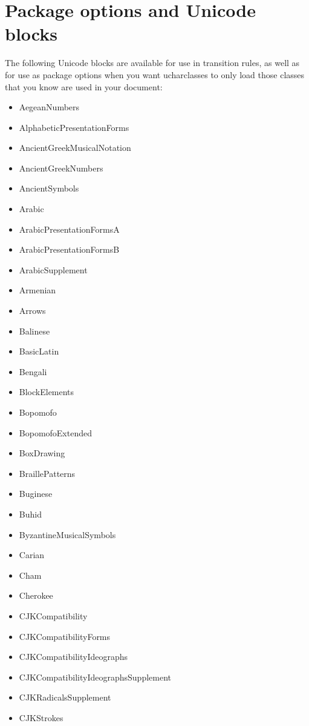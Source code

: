 ﻿\documentclass{article}
\newenvironment{itemlist}{%
  \begin{itemize}
	\setlength{\itemsep}{0pt}
	\setlength{\parsep}{0pt}
	\setlength{\topsep}{0pt}
	\setlength{\partopsep}{0pt}
	\setlength{\parskip}{0pt}
	\setlength{\labelsep}{5pt}}%
{
  \end{itemize}}
\begin{document}
	\section{Package options and Unicode blocks}
	
		The following Unicode blocks are available for use in transition rules, as well as for use as package options when you want ucharclasses to only load those classes that you know are used in your document:
		
		\begin{multicols}{2}
			\begin{itemlist}
				\item AegeanNumbers
				\item AlphabeticPresentationForms
				\item AncientGreekMusicalNotation
				\item AncientGreekNumbers
				\item AncientSymbols
				\item Arabic
				\item ArabicPresentationFormsA
				\item ArabicPresentationFormsB
				\item ArabicSupplement
				\item Armenian
				\item Arrows
				\item Balinese
				\item BasicLatin
				\item Bengali
				\item BlockElements
				\item Bopomofo
				\item BopomofoExtended
				\item BoxDrawing
				\item BraillePatterns
				\item Buginese
				\item Buhid
				\item ByzantineMusicalSymbols
				\item Carian
				\item Cham
				\item Cherokee
				\item CJKCompatibility
				\item CJKCompatibilityForms
				\item CJKCompatibilityIdeographs
				\item CJKCompatibilityIdeographsSupplement
				\item CJKRadicalsSupplement
				\item CJKStrokes

\end{itemlist}
\end{multicols}
\end{document}
